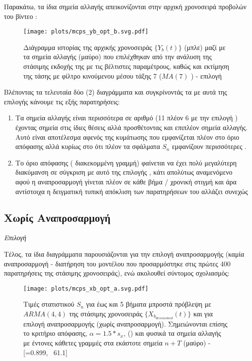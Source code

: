Παρακάτω, τα ίδια σημεία αλλαγής απεικονίζονται στην αρχική χρονοσειρά προβολών του βίντεο :

\begin{figure}[H]
    \begin{center}
        \texttt{[image: plots/mcps\_yb\_opt\_b.svg.pdf]}
        \caption{Διάγραμμα ιστορίας της αρχικής χρονοσειράς $\{Y_b(t)\}$ (μπλε) μαζί με τα σημεία αλλαγής (μαύρο) που επιλέχθηκαν από την ανάλυση της στάσιμης εκδοχής της με τις βέλτιστες παραμέτρους, καθώς και εκτίμηση της τάσης με φίλτρο κινούμενου μέσου τάξης 7 ($MA(7)$ ) - επιλογή }
        \label{fig:mcps_yb_opt_b}
    \end{center}
\end{figure}

Βλέποντας τα τελευταία δύο (2) διαγράμματα και συγκρίνοντάς τα με αυτά της επιλογής  κάνουμε τις εξής παρατηρήσεις:
\begin{enumerate}
    \item Τα σημεία αλλαγής είναι περισσότερα σε αριθμό (11 πλέον  6 με την επιλογή ) έχοντας σημεία στις ίδιες θέσεις αλλά προσθέτοντας και επιπλέον σημεία αλλαγής. Αυτό είναι αποτέλεσμα αφενός της κυμάτωσης που εμφανίζεται πλέον στο όριο απόφασης αλλά κυρίως στο ότι πλέον τα σφάλματα $S_n$ εμφανίζουν περισσότερες .
    \item Το όριο απόφασης ( διακεκομμένη γραμμή) φαίνεται να έχει πολύ μεγαλύτερη διακύμανση σε σύγκριση με αυτό της επιλογής , κάτι απολύτως αναμενόμενο αφού η αναπροσαρμογή γίνεται πλέον σε κάθε βήμα / χρονική στιγμή και άρα αντίστοιχα η δειγματική τυπική απόκλιση των παρατηρήσεων του  αλλάζει συνεχώς
\end{enumerate}

\subsection{Χωρίς Αναπροσαρμογή}

\textit{Επιλογή }

\par Τέλος, τα ίδια διαγράμματα παρουσιάζονται για την επιλογή αναπροσαρμογής  (καμία αναπροσαρμογή - διατήρηση του μοντέλου που προσαρμόστηκε στις πρώτες 400 παρατηρήσεις της στάσιμης χρονοσειράς), ενώ ακολουθεί σύντομος σχολιασμός:

\begin{figure}[H]
    \begin{center}
        \texttt{[image: plots/mcps\_xb\_opt\_a.svg.pdf]}
        \caption{Τιμές στατιστικού $S_n$ για έως και 5 βήματα μπροστά πρόβλεψη με $ARMA(4,4)$ της στάσιμης χρονοσειράς $\{X_{b_{deseasoned}}(t)\}$ και για επιλογή αναπροσαρμογής  (χωρίς αναπροσαρμογή). Σημειώνονται επίσης το κριτήριο απόφασης, $\alpha=1.5*s_x$, () και φυσικά τα σημεία αλλαγής με έντονες κάθετες γραμμές στα εκάστοτε σημεία $n+T$ (μαύρο) - [=0.899, \ 61.1]}
        \label{fig:mcps_xb_opt_a}
    \end{center}
\end{figure}

